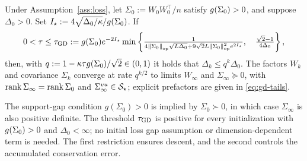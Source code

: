 \begin{theorem}
\label{thm:gd}\label{thm:discrete-bootstrap}
Under Assumption~\ref{ass:loss}, let $\Sigma_0:=W_0W_0^\top/n$ satisfy
$g(\Sigma_0)>0$, and suppose $\Delta_0>0$. Set
$I_\star:=4\sqrt{\Delta_0/\kappa}/g(\Sigma_0)$. If
\begin{equation}\label{eq:gd-step}
 0<\tau\le\tau_{\rm GD}:=g(\Sigma_0)e^{-2I_\star}\min\left\{
 \tfrac{1}{4\left\lVert \Sigma_0 \right\rVert_{\mathrm{op}}\sqrt{L\Delta_0}
              +9\sqrt2 L\left\lVert \Sigma_0 \right\rVert_{\mathrm{op}}^2e^{2I_\star}},\quad
 \tfrac{\sqrt2-1}{4\Delta_0}
 \right\},
\end{equation}
then, with $q:=1-\kappa\tau g(\Sigma_0)/\sqrt2\in(0,1)$ it holds that \(\Delta_k\le q^k\Delta_0\).
The factors $W_k$ and covariance $\Sigma_k$ converge at rate $q^{k/2}$ to limits
$W_\infty$ and $\Sigma_\infty\succeq0$, with
$\operatorname{rank}\Sigma_\infty=\operatorname{rank}\Sigma_0$ and
$\Sigma^{vu}_\infty\in\mathcal S_\star$; explicit prefactors are given in
\eqref{eq:gd-tails}.
\end{theorem}

The support-gap condition $g(\Sigma_0) > 0$ is implied by $\Sigma_0\succ0$, in which case $\Sigma_\infty$ is also positive definite.
The threshold $\tau_{\rm GD}$ is positive for every initialization with $g(\Sigma_0)>0$ and $\Delta_0 < \infty$; no initial loss gap assumption or dimension-dependent term is needed.
The first restriction ensures descent, and the second controls the accumulated conservation error.

